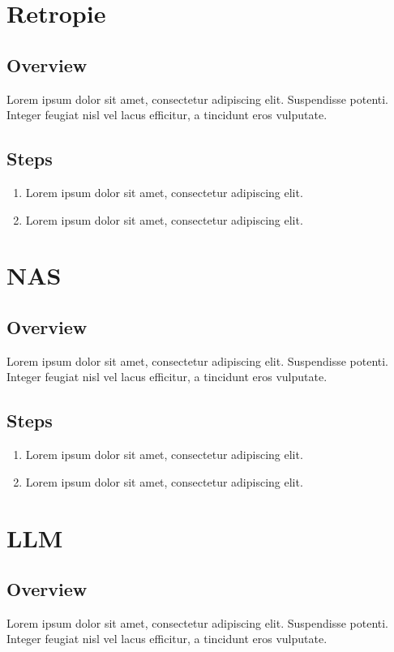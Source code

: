 \documentclass[a4paper,12pt]{article}
\begin{document}
\section{Retropie}

\subsection{Overview}
Lorem ipsum dolor sit amet, consectetur adipiscing elit. Suspendisse potenti. Integer feugiat nisl vel lacus efficitur, a tincidunt eros vulputate.

\subsection{Steps}
\begin{enumerate}
    \item Lorem ipsum dolor sit amet, consectetur adipiscing elit.
    \item Lorem ipsum dolor sit amet, consectetur adipiscing elit.
\end{enumerate}

\section{NAS}

\subsection{Overview}
Lorem ipsum dolor sit amet, consectetur adipiscing elit. Suspendisse potenti. Integer feugiat nisl vel lacus efficitur, a tincidunt eros vulputate.

\subsection{Steps}
\begin{enumerate}
    \item Lorem ipsum dolor sit amet, consectetur adipiscing elit.
    \item Lorem ipsum dolor sit amet, consectetur adipiscing elit.
\end{enumerate}

\section{LLM}

\subsection{Overview}
Lorem ipsum dolor sit amet, consectetur adipiscing elit. Suspendisse potenti. Integer feugiat nisl vel lacus efficitur, a tincidunt eros vulputate.
\end{document}
